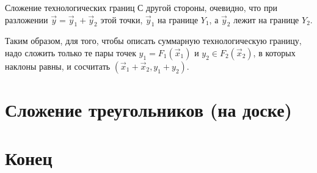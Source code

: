 \documentclass{beamer}
\begin{document}
\begin{frame}{Сложение технологических границ}
С другой стороны, очевидно, что при разложении $\vec y = \vec y_1 + \vec y_2$ этой точки, $\vec y_1$ на границе $Y_1$, а $\vec y_2$ лежит на границе $Y_2$. 

Таким образом, для того, чтобы описать суммарную технологическую границу, надо сложить только те пары точек $y_1 = F_1(\vec x_1)$ и $y_2 \in F_2(\vec x_2)$, в которых наклоны равны, и сосчитать $(\vec x_1 + \vec x_2, y_1 + y_2)$.

\end{frame}
\section{Сложение треугольников (на доске)}
\section{Конец}
\end{document}
